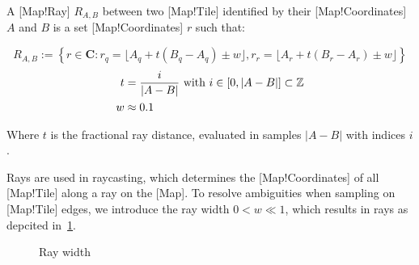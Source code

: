 A [Map!Ray] \(R_{A,B}\) between two [Map!Tile] identified by their [Map!Coordinates] \(A\) and \(B\) is a set [Map!Coordinates] \(r\) such that:

\begin{equation}\label{eq:map_ray}
    R_{A,B} := \left \{ r \in \mathbf{C} :
        r_q = \lfloor A_q + t(B_q-A_q) \pm w \rfloor,
        r_r = \lfloor A_r + t(B_r-A_r) \pm w \rfloor
    \right \}
\end{equation}
\begin{align*}
    t &= \frac{i}{|A-B|}\text{ with \(i \in \interval{0}{|A-B|} \subset \mathbb{Z}\)}\\
    w &\approx 0.1
\end{align*}

Where \(t\) is the fractional ray distance, evaluated in samples \(|A-B|\) with indices \(i\).

Rays are used in raycasting, which determines the [Map!Coordinates] of all [Map!Tile] along a ray on the [Map].
To resolve ambiguities when sampling on [Map!Tile] edges, we introduce the ray width \(0 < w \ll 1\), which results in rays as depcited in~\ref{fig:map_ray}.

\begin{figure}[htbp]
    \centering
    \begin{subfigure}{0.48\textwidth}
        \centering
    \end{subfigure}
    \begin{subfigure}{0.48\textwidth}
        \centering
    \end{subfigure}
    \caption{Ray width}\label{fig:map_ray}
\end{figure}

